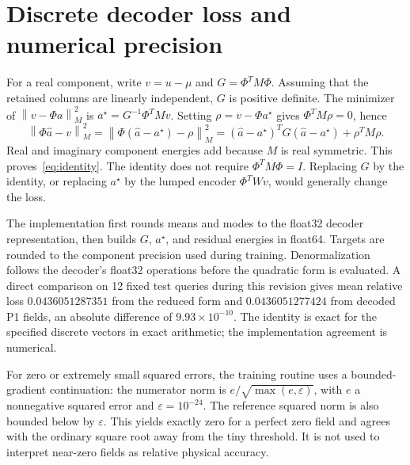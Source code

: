 \documentclass{article}
\newcommand{\norm}[1]{\left\lVert#1\right\rVert}
\begin{document}
\clearpage
\raggedbottom
\balance



\clearpage
\nobalance
\appendix
\onecolumn
\section{Discrete decoder loss and numerical precision}\label{app:loss}
For a real component, write $v=u-\mu$ and $G=\Phi^TM\Phi$. Assuming that the retained columns are linearly independent, $G$ is positive definite. The minimizer of $\norm{v-\Phi a}_M^2$ is $a^\star=G^{-1}\Phi^TMv$. Setting $\rho=v-\Phi a^\star$ gives $\Phi^TM\rho=0$, hence
\begin{equation}
\norm{\Phi\widehat a-v}_M^2
=\norm{\Phi(\widehat a-a^\star)-\rho}_M^2
=(\widehat a-a^\star)^TG(\widehat a-a^\star)+\rho^TM\rho.
\end{equation}
Real and imaginary component energies add because $M$ is real symmetric. This proves~\eqref{eq:identity}. The identity does not require $\Phi^TM\Phi=I$. Replacing $G$ by the identity, or replacing $a^\star$ by the lumped encoder $\Phi^TWv$, would generally change the loss.

The implementation first rounds means and modes to the float32 decoder representation, then builds $G$, $a^\star$, and residual energies in float64. Targets are rounded to the component precision used during training. Denormalization follows the decoder's float32 operations before the quadratic form is evaluated. A direct comparison on 12 fixed test queries during this revision gives mean relative loss $0.0436051287351$ from the reduced form and $0.0436051277424$ from decoded P1 fields, an absolute difference of $9.93\times10^{-10}$. The identity is exact for the specified discrete vectors in exact arithmetic; the implementation agreement is numerical.

For zero or extremely small squared errors, the training routine uses a bounded-gradient continuation: the numerator norm is $e/\sqrt{\max(e,\varepsilon)}$, with $e$ a nonnegative squared error and $\varepsilon=10^{-24}$. The reference squared norm is also bounded below by $\varepsilon$. This yields exactly zero for a perfect zero field and agrees with the ordinary square root away from the tiny threshold. It is not used to interpret near-zero fields as relative physical accuracy.
\end{document}
